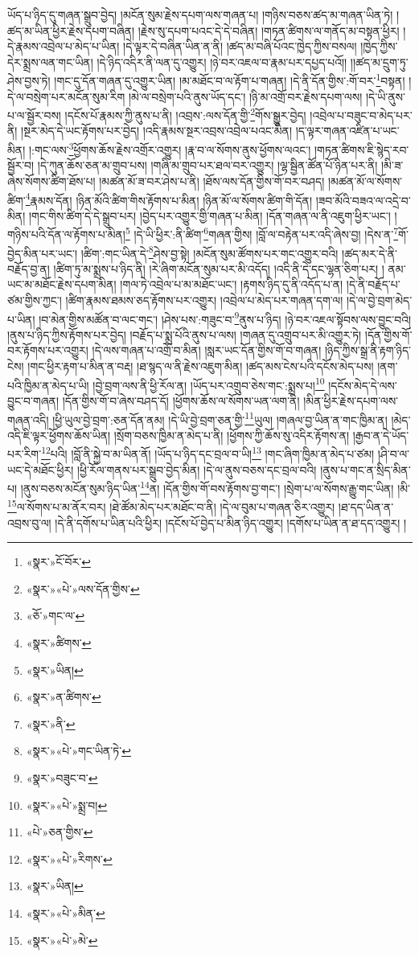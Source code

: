 ཡོད་པ་ཉིད་དུ་གཞན་སྒྲུབ་བྱེད། །མངོན་སུམ་རྗེས་དཔག་ལས་གཞན་པ། །གཉིས་བཅས་ཚད་མ་གཞན་ཡིན་ཏེ། །ཚད་མ་ཡིན་ཕྱིར་རྗེས་དཔག་བཞིན། །རྗེས་སུ་དཔག་པའང་དེ་དེ་བཞིན། །གཏན་ཚིགས་ལ་གནོད་མ་བསྟན་ཕྱིར། །དེ་རྣམས་འབྲེལ་པ་མེད་པ་ཡིན། །དེ་ལྟར་དེ་བཞིན་ཡིན་ན་ནི། །ཚད་མ་བཞི་པོའང་ཁྱེད་ཀྱིས་བསལ། །ཁྱེད་ཀྱིས་དེར་སྨྲས་ལན་གང་ཡིན། །དེ་ཉིད་འདིར་ནི་ལན་དུ་འགྱུར། །ཉེ་བར་འཇལ་བ་རྣམ་པར་དཔྱད་པའོ།། །།ཚད་མ་དྲུག་ཏུ་ཤེས་བྱས་ཏེ། །གང་དུ་དོན་གཞན་དུ་འགྱུར་ཡིན། །མ་མཐོང་བ་ལ་རྟོག་པ་གཞན། །དེ་ནི་དོན་གྱིས་:གོ་བར་\footnote{«སྣར་»ངོ་བོར་}བསྟན། །དེ་ལ་བསྲེག་པར་མངོན་སུམ་རིག །མེ་ལ་བསྲེག་པའི་ནུས་ཡོད་དང་། །ཉི་མ་འགྲོ་བར་རྗེས་དཔག་ལས། །དེ་ཡི་ནུས་པ་ལ་སྦྱོར་བས། །དངོས་པོ་རྣམས་ཀྱི་ནུས་པ་ནི། །འབྲས་:ལས་དོན་གྱི་\footnote{«སྣར་»«པེ་»ལས་དོན་གྱིས་}གོས་སྒྱུར་བྱེད། །འབྲེལ་པ་བཟུང་བ་མེད་པར་ནི། །སྔར་མེད་དེ་ཡང་རྟོགས་པར་བྱེད། །འདི་རྣམས་སྔར་འབྲས་འབྲེལ་པའང་མིན། །ད་ལྟར་གཞན་འཛིན་པ་ཡང་མིན། །:གང་ལས་\footnote{«ཅོ་»གང་ལ་}ཕྱོགས་ཆོས་རྗེས་འགྲོར་འགྱུར། །རྣ་བ་ལ་སོགས་ནུས་ཕྱོགས་ལའང་། །གཏན་ཚིགས་ཇི་སྙེད་རབ་སྦྱོར་བ། །དེ་ཀུན་ཆོས་ཅན་མ་གྲུབ་པས། །གཞི་མ་གྲུབ་པར་ཐལ་བར་འགྱུར། །ལྷ་སྦྱིན་ཚོན་པོ་ཉིན་པར་ནི། །མི་ཟ་ཞེས་སོགས་ཚིག་ཐོས་པ། །མཚན་མོ་ཟ་བར་ཤེས་པ་ནི། །ཐོས་ལས་དོན་གྱིས་གོ་བར་བཤད། །མཚན་མོ་ལ་སོགས་ཚིག་\footnote{«སྣར་»ཚིགས་}རྣམས་དོན། །ཉིན་མོའི་ཚིག་གིས་རྟོགས་པ་མིན། །ཉིན་མོ་ལ་སོགས་ཚིག་གི་དོན། །ཟབ་མོའི་བཟའ་ལ་འདྲེ་བ་མིན། །གང་གིས་ཚིག་དེ་དེ་སྒྲུབ་པར། །བྱེད་པར་འགྱུར་གྱི་གཞན་པ་མིན། །དོན་གཞན་ལ་ནི་འཇུག་ཕྱིར་ཡང་། །གཉིས་པའི་དོན་ལ་རྟོགས་པ་མིན།\footnote{«སྣར་»ཡིན།} །དེ་ཡི་ཕྱིར་:ནི་ཚིག་\footnote{«སྣར་»ན་ཚིགས་}གཞན་གྱིས། །བློ་ལ་བརྟེན་པར་འདི་ཞེས་བྱ། །དེས་ན་\footnote{«སྣར་»ནི་}གོ་བྱེད་མིན་པར་ཡང་། །ཚིག་:གང་ཡིན་དེ་\footnote{«སྣར་»«པེ་»གང་ཡིན་ཏེ་}ཤེས་བྱ་སྟེ། །མངོན་སུམ་ཚོགས་པར་གང་འགྱུར་བའི། །ཚད་མར་དེ་ནི་བརྗོད་བྱ་ན། །ཚིག་ཏུ་མ་སྨྲས་པ་ཉིད་ནི། །རེ་ཞིག་མངོན་སུམ་པར་མི་འདོད། །འདི་ནི་དེ་དང་ལྷན་ཅིག་པར། །
ནམ་ཡང་མ་མཐོང་རྗེས་དཔག་མིན། །གལ་ཏེ་འབྲེལ་པ་མ་མཐོང་ཡང་། །རྟགས་ཉིད་དུ་ནི་འདོད་པ་ན། །དེ་ནི་བརྗོད་པ་ཙམ་གྱིས་ཀྱང་། །ཚིག་རྣམས་ཐམས་ཅད་རྟོགས་པར་འགྱུར། །འབྲེལ་པ་མེད་པར་གཞན་དག་ལ། །དེ་ལ་བྱེ་བྲག་མེད་པ་ཡིན། །བ་མེན་གྱིས་མཚོན་བ་ལང་གང་། །ཤེས་པས་:གཟུང་བ་\footnote{«སྣར་»བཟུང་བ་}ནུས་པ་ཉིད། །ཉེ་བར་འཇལ་སྟོབས་ལས་བྱུང་བའི། །ནུས་པ་ཉིད་ཀྱིས་རྟོགས་པར་བྱེད། །བརྗོད་པ་སྨྲ་པོའི་ནུས་པ་ལས། །གཞན་དུ་འགྲུབ་པར་མི་འགྱུར་ཏེ། །དོན་གྱིས་གོ་བར་རྟོགས་པར་འགྱུར། །དེ་ལས་གཞན་པ་འགྲོ་བ་མིན། །སླར་ཡང་དོན་གྱིས་གོ་བ་གཞན། །ཉིད་ཀྱིས་སྒྲ་ནི་རྟག་ཉིད་ངེས། །གང་ཕྱིར་རྟག་པ་མིན་ན་བརྡ། །ཐ་སྙད་ལ་ནི་རྗེས་འཇུག་མིན། །ཚད་མས་ངེས་པའི་དངོས་མེད་པས། །ནག་པའི་ཁྱིམ་ན་མེད་པ་ཡི། །བྱེ་བྲག་ལས་ནི་ཕྱི་རོལ་ན། །ཡོད་པར་འགྲུབ་ཅེས་གང་:སྨྲས་པ།\footnote{«སྣར་»«པེ་»སྨྲ་བ།} །དངོས་མེད་དེ་ལས་བྱུང་བ་གཞན། །དོན་གྱིས་གོ་བ་ཞེས་བཤད་དོ། །ཕྱོགས་ཆོས་ལ་སོགས་ཡན་ལག་ནི། །མིན་ཕྱིར་རྗེས་དཔག་ལས་གཞན་འདི། །ཕྱི་ཡུལ་བྱེ་བྲག་:ཅན་དོན་ནམ། །དེ་ཡི་བྱེ་བྲག་ཅན་གྱི་\footnote{«པེ་»ཅན་གྱིས་}ཡུལ། །གཞལ་བྱ་ཡིན་ན་གང་ཁྱིམ་ན། །མེད་འདི་ཇི་ལྟར་ཕྱོགས་ཆོས་ཡིན། །སྲོག་བཅས་ཁྱིམ་ན་མེད་པ་ནི། །ཕྱོགས་ཀྱི་ཆོས་སུ་འདིར་རྟོགས་ན། །རྒྱབ་ན་དེ་ཡོད་པར་རིག་\footnote{«སྣར་»«པེ་»རིགས་}པའི། །བློ་ནི་སྐྱེ་བ་མ་ཡིན་ནོ། །ཡོད་པ་ཉིད་དང་བྲལ་བ་ཡི།\footnote{«སྣར་»ཡིན།} །གང་ཞིག་ཁྱིམ་ན་མེད་པ་ཙམ། །ཤི་བ་ལ་ཡང་དེ་མཐོང་ཕྱིར། །ཕྱི་རོལ་གནས་པར་སྒྲུབ་བྱེད་མིན། །དེ་ལ་ནུས་བཅས་དང་བྲལ་བའི། །ནུས་པ་གང་ན་སྲིད་མིན་པ། །ནུས་བཅས་མངོན་སུམ་ཉིད་ཡིན་\footnote{«སྣར་»«པེ་»མིན་}ན། །དོན་གྱིས་གོ་བས་རྟོགས་བྱ་གང་། །སྲེག་པ་ལ་སོགས་རྒྱུ་གང་ཡིན། །མི་\footnote{«སྣར་»«པེ་»མེ་}ལ་སོགས་པ་མ་ནོར་བར། །ཐེ་ཚོམ་མེད་པར་མཐོང་བ་ནི། །དེ་ལ་བུམ་པ་གཞན་ཅིར་འགྱུར། །ཐ་དད་ཡིན་ན་འབྲས་བུ་ལ། །དེ་ནི་དགོས་པ་ཡིན་པའི་ཕྱིར། །དངོས་པོ་བྱེད་པ་མིན་ཉིད་འགྱུར། །དགོས་པ་ཡིན་ན་ཐ་དད་འགྱུར། །
